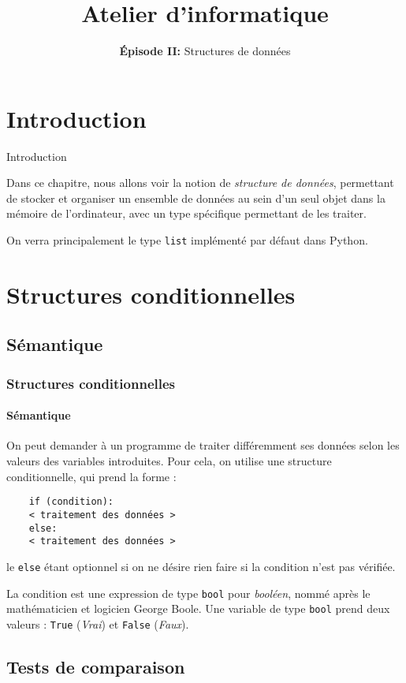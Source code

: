 \documentclass[10pt,xcolor={dvipsnames}]{beamer}
\title{Atelier d'informatique}
\subtitle{\textbf{Épisode II:} Structures de données}
\begin{document}
\begin{frame}[fragile]
	\titlepage
\end{frame}

\section{Introduction}

\begin{frame}[fragile]{Introduction}
	
	Dans ce chapitre, nous allons voir la notion de \textit{structure de données}, permettant de stocker et organiser un ensemble de données au sein d'un seul objet dans la mémoire de l'ordinateur, avec un type spécifique permettant de les traiter.
	\pause
	
	On verra principalement le type \lstinline|list| implémenté par défaut dans Python.
\end{frame}

\frame{\tableofcontents}

\section{Structures conditionnelles}

\subsection{Sémantique}

\begin{frame}[fragile]
	\frametitle{Structures conditionnelles}
	\framesubtitle{Sémantique}
	On peut demander à un programme de traiter différemment ses données selon les valeurs des variables introduites. Pour cela, on utilise une structure conditionnelle, qui prend la forme :
	\begin{lstlisting}
	if (condition):
	< traitement des données >
	else:
	< traitement des données >
	\end{lstlisting}
	le \lstinline|else| étant optionnel si on ne désire rien faire si la condition n'est pas vérifiée.
	\pause
	
	La condition est une expression de type \lstinline|bool| pour \textit{booléen}, nommé après le mathématicien et logicien George Boole. Une variable de type \lstinline|bool| prend deux valeurs : \lstinline|True| (\textit{Vrai}) et \lstinline|False| (\textit{Faux}).
\end{frame}

\subsection{Tests de comparaison}
\end{document}
